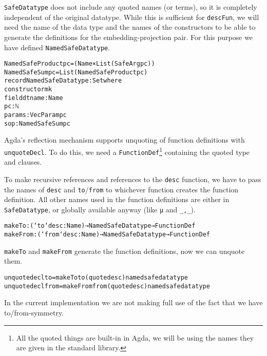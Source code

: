 \texttt{SafeDatatype} does not include any quoted names (or terms), so
it is completely independent of the original datatype.
While this is sufficient for \texttt{descFun}, we will need the name
of the data type and the names of the constructors to be able to
generate the definitions for the embedding-projection pair.
For this purpose we have defined \texttt{NamedSafeDatatype}.

\begin{alltt}
NamedSafeProduct {pc} = (Name × List (SafeArg {pc}))
NamedSafeSum {pc} = List (NamedSafeProduct {pc})
record NamedSafeDatatype : Set where
  constructor mk
  field dtname : Name
        pc : ℕ
        params : Vec Param pc
        sop : NamedSafeSum {pc}
\end{alltt}

Agda's reflection mechanism supports unquoting of function definitions
with \texttt{unquoteDecl}.
To do this, we need a \texttt{FunctionDef}\footnote{All the quoted
  things are built-in in Agda, we will be using the names they are
  given in the standard library.} containing the quoted type and
clauses.

To make recursive references and references to the \texttt{desc}
function, we have to pass the names of \texttt{desc} and
\texttt{to}/\texttt{from} to whichever function creates the function
definition.
All other names used in the function definitions are either in
\texttt{SafeDatatype}, or globally available anyway (like \texttt{μ}
and \texttt{\_,\_}).

\begin{alltt}
makeTo : (`to `desc : Name) → NamedSafeDatatype → FunctionDef
makeFrom : (`from `desc : Name) → NamedSafeDatatype → FunctionDef
\end{alltt}

\texttt{makeTo} and \texttt{makeFrom} generate the function
definitions, now we can unquote them.

\begin{alltt}
unquotedecl to = makeTo to (quote desc) namedsafedatatype
unquotedecl from = makeFrom from (quote desc) namedsafedatatype
\end{alltt}

\begin{remark}
In the current implementation we are not making full use of the fact
that we have to/from-symmetry.
\end{remark}


